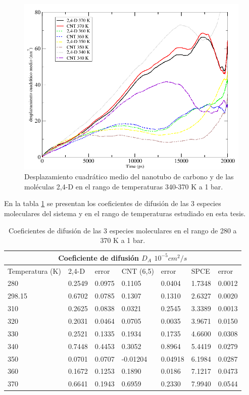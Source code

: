 \begin{figure}[!h]
    \centering
    \includegraphics[width=.8\textwidth,keepaspectratio=true]{resultados/comparacion_msd_cnt_24d_340-370.png}
    \caption{Desplazamiento cuadrático medio del nanotubo de carbono y de las moléculas 2,4-D en el rango de temperaturas 340-370 K a 1 bar.}
    \label{fig:comparación_msd_cnt_24d_340-370}
\end{figure}

En la tabla \ref{tab:coefdifall} se presentan los coeficientes de difusión de las 3 especies moleculares del sistema y en el rango de temperaturas estudiado en esta tesis.

\begin{table}[h!]
    \centering
    \begin{tabular}{ |m{8em}|m{3em}|m{3em}|m{5em}|m{3em}|m{3em}|m{3em}|  }
    \hline
    \multicolumn{7}{|c|}{Coeficiente de difusión $D_A$ $10^{-5} cm^2/s$} \\
    \hline
    Temperatura (K) & 2,4-D & error & CNT (6,5) & error & SPCE & error\\
    \hline
    280 &  0.2549 & 0.0975 & 0.1105 & 0.0404 & 1.7348 & 0.0012\\
    \hline
    298.15 &  0.6702 & 0.0785 & 0.1307 & 0.1310 & 2.6327 & 0.0020\\
    \hline
    310 &  0.2625 & 0.0838 & 0.0321 & 0.2545 & 3.3389 & 0.0013\\
    \hline
    320 &  0.2031 & 0.0464 & 0.0705 & 0.0035 & 3.9671 & 0.0150\\
    \hline
    330 &  0.2521 & 0.1335 & 0.1934 & 0.1735 & 4.6600 & 0.0308\\
    \hline
    340 &  0.7448 & 0.4453 & 0.3052 & 0.8964 & 5.4419 & 0.0279\\
    \hline
    350 &  0.0701 & 0.0707 & -0.01204 & 0.04918 & 6.1984 & 0.0287\\
    \hline
    360 &  0.1672 & 0.1253 & 0.1890 & 0.0186 & 7.1217 & 0.0473\\
    \hline
    370 &  0.6641 & 0.1943 & 0.6959 & 0.2330 & 7.9940 & 0.0544\\
    \hline
    \end{tabular}
    \caption{Coeficientes de difusión de las 3 especies moleculares en el rango de 280 a 370 K a 1 bar.}
    \label{tab:coefdifall}
\end{table} 

